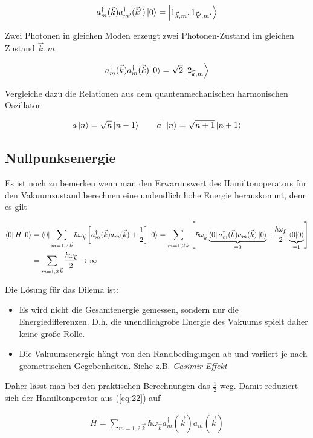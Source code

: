 \begin{align}
  \label{eq:25}
   a^\dagger_{m}(\vec k)  a^\dagger_{m'}(\vec k') \left| 0 \right\rangle = \left| 1_{\vec k,m},1_{\vec k',m'} \right\rangle
\end{align}

Zwei Photonen in gleichen Moden erzeugt zwei Photonen-Zustand im gleichen Zustand \(\vec k,m\)

\begin{align}
  \label{eq:26}
    a^\dagger_{m}(\vec k) a^\dagger_{m}(\vec k) \left| 0 \right\rangle = \sqrt{2} \left| 2_{\vec k,m} \right\rangle
\end{align}

Vergleiche dazu die Relationen aus dem quantenmechanischen harmonischen Oszillator

\begin{align}
  \label{eq:27}
  a\left| n \right\rangle = \sqrt{n}\left| n-1 \right\rangle \qquad  a^\dagger \left| n \right\rangle = \sqrt{n+1}\left| n+1 \right\rangle
\end{align}

\subsection*{Nullpunksenergie}
Es ist noch zu bemerken wenn man den Erwarunswert des Hamiltonoperators für den Vakuumzustand berechnen eine undendlich hohe Energie herauskommt, denn es gilt

\begin{align}
  \label{eq:28}
  \bra{0} H \ket{0} &= \bra{0}\sum_{m=1,2\, \vec k} \hbar \omega_{\vec k} \left[  a^\dagger_m(\vec k) a_m(\vec k) + \frac{1}{2}\right]\ket{0} = \sum_{m=1,2\, \vec k}\left[\hbar \omega_{\vec k}  \underbr{\bra{0}  a^\dagger_m(\vec k) a_m(\vec k)\ket{0}}_{=0} + \frac{\hbar \omega_{\vec k}}{2} \underbr{\braket{0}{0}}_{=1} \right]\notag \\
&= \sum_{m=1,2\, \vec k}\frac{\hbar \omega_{\vec k}}{2} \rightarrow \infty
\end{align}

Die Lösung für das Dilema ist:

\begin{itemize}
\item  Es wird nicht die Gesamtenergie gemessen, sondern nur die Energiedifferenzen. D.h. die unendlichgroße Energie des Vakuums spielt daher keine große Rolle.
\item Die Vakuumsenergie hängt von den Randbedingungen ab und variiert je nach geometrischen Gegebenheiten. Siehe z.B. \textit{Casimir-Effekt}
\end{itemize}

Daher lässt man bei den praktischen Berechnungen das \(\frac{1}{2}\) weg. Damit reduziert sich der Hamiltonperator aus (\ref{eq:22}) auf

\begin{align}
  \label{eq:29}
\boxed{   H = \sum_{m=1,2\,\vec k}  \hbar \omega_{\vec k} a^\dagger_m(\vec k) a_m(\vec k)  }
\end{align}




